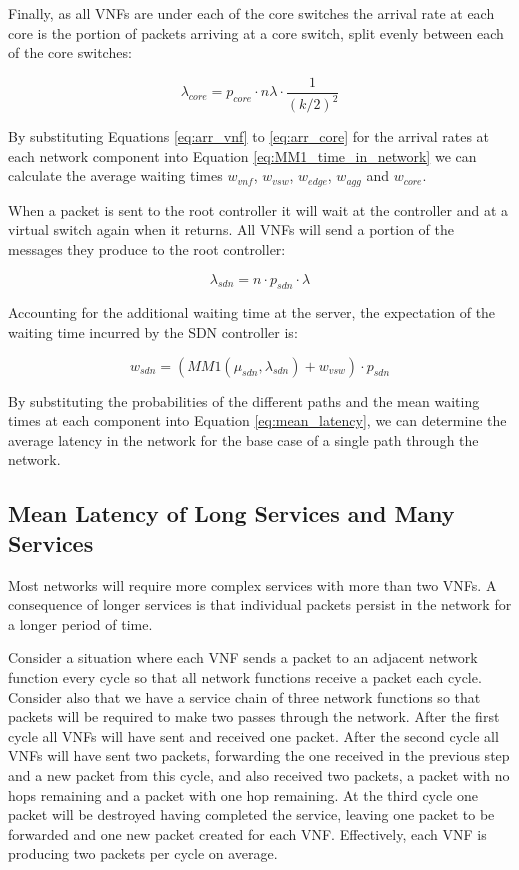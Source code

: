 Finally, as all VNFs are under each of the core switches the arrival rate at each core is the portion of packets arriving at a core switch, split evenly between each of the core switches:

\begin{equation}
\label{eq:arr_core}
\lambda_{core} = p_{core} \cdot n \lambda \cdot  \frac{1}{(k / 2)^2}
\end{equation}

By substituting Equations \ref{eq:arr_vnf} to \ref{eq:arr_core} for the arrival rates at each network component into Equation \ref{eq:MM1_time_in_network} we can calculate the average waiting times $w_{vnf}$, $w_{vsw}$, $w_{edge}$, $w_{agg}$ and $w_{core}$.

When a packet is sent to the root controller it will wait at the controller and at a virtual switch again when it returns. All VNFs will send a portion of the messages they produce to the root controller:

\begin{equation}
\label{eq:arr_sdn}
\lambda_{sdn} = n \cdot p_{sdn} \cdot \lambda
\end{equation}

Accounting for the additional waiting time at the server, the expectation of the waiting time incurred by the SDN controller is:

\begin{equation}
\label{eq:wait_sdn}
w_{sdn} = (MM1(\mu_{sdn}, \lambda_{sdn}) + w_{vsw}) \cdot p_{sdn}
\end{equation}

By substituting the probabilities of the different paths and the mean waiting times at each component into Equation \ref{eq:mean_latency}, we can determine the average latency in the network for the base case of a single path through the network.

\subsection{Mean Latency of Long Services and Many Services}
Most networks will require more complex services with more than two VNFs. A consequence of longer services is that individual packets persist in the network for a longer period of time. 

Consider a situation where each VNF sends a packet to an adjacent network function every cycle so that all network functions receive a packet each cycle. Consider also that we have a service chain of three network functions so that packets will be required to make two passes through the network. After the first cycle all VNFs will have sent and received one packet. After the second cycle all VNFs will have sent two packets, forwarding the one received in the previous step and a new packet from this cycle, and also received two packets, a packet with no hops remaining and a packet with one hop remaining. At the third cycle one packet will be destroyed having completed the service, leaving one packet to be forwarded and one new packet created for each VNF. Effectively, each VNF is producing two packets per cycle on average.

